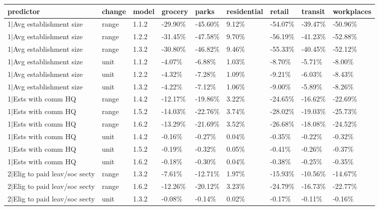 \begin{table}[ht]
\centering
\begin{tabular}{lllllllll}
  \hline
predictor & change & model & grocery & parks & residential & retail & transit & workplaces \\ 
  \hline
1$|$Avg establishment size & range & 1.1.2 & -29.90\% & -45.60\% & 9.12\% & -54.07\% & -39.47\% & -50.96\% \\ 
  1$|$Avg establishment size & range & 1.2.2 & -31.45\% & -47.58\% & 9.70\% & -56.19\% & -41.23\% & -52.88\% \\ 
  1$|$Avg establishment size & range & 1.3.2 & -30.80\% & -46.82\% & 9.46\% & -55.33\% & -40.45\% & -52.12\% \\ 
  1$|$Avg establishment size & unit & 1.1.2 & -4.07\% & -6.88\% & 1.03\% & -8.70\% & -5.71\% & -8.00\% \\ 
  1$|$Avg establishment size & unit & 1.2.2 & -4.32\% & -7.28\% & 1.09\% & -9.21\% & -6.03\% & -8.43\% \\ 
  1$|$Avg establishment size & unit & 1.3.2 & -4.22\% & -7.12\% & 1.06\% & -9.00\% & -5.89\% & -8.26\% \\ 
  1$|$Ests with comm HQ & range & 1.4.2 & -12.17\% & -19.86\% & 3.22\% & -24.65\% & -16.62\% & -22.69\% \\ 
  1$|$Ests with comm HQ & range & 1.5.2 & -14.03\% & -22.76\% & 3.74\% & -28.02\% & -19.03\% & -25.73\% \\ 
  1$|$Ests with comm HQ & range & 1.6.2 & -13.29\% & -21.69\% & 3.52\% & -26.68\% & -18.08\% & -24.52\% \\ 
  1$|$Ests with comm HQ & unit & 1.4.2 & -0.16\% & -0.27\% & 0.04\% & -0.35\% & -0.22\% & -0.32\% \\ 
  1$|$Ests with comm HQ & unit & 1.5.2 & -0.19\% & -0.32\% & 0.05\% & -0.41\% & -0.26\% & -0.37\% \\ 
  1$|$Ests with comm HQ & unit & 1.6.2 & -0.18\% & -0.30\% & 0.04\% & -0.38\% & -0.25\% & -0.35\% \\ 
  2$|$Elig to paid leav/soc secty & range & 1.3.2 & -7.61\% & -12.71\% & 1.97\% & -15.93\% & -10.56\% & -14.67\% \\ 
  2$|$Elig to paid leav/soc secty & range & 1.6.2 & -12.26\% & -20.12\% & 3.23\% & -24.79\% & -16.73\% & -22.77\% \\ 
  2$|$Elig to paid leav/soc secty & unit & 1.3.2 & -0.08\% & -0.14\% & 0.02\% & -0.17\% & -0.11\% & -0.16\% \\ 

\end{tabular}
\end{table}
